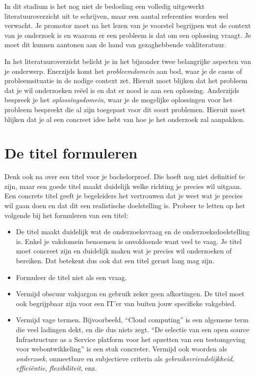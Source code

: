 In dit stadium is het nog niet de bedoeling een volledig uitgewerkt literatuuroverzicht uit te schrijven, maar een aantal referenties worden wel verwacht. Je promotor moet na het lezen van je voorstel begrijpen wat de context van je onderzoek is en waarom er een probleem is dat om een oplossing vraagt. Je moet dit kunnen aantonen aan de hand van gezaghebbende vakliteratuur.

In het literatuuroverzicht belicht je in het bijzonder twee belangrijke aspecten van je onderwerp. Enerzijds komt het \emph{probleemdomein} aan bod, waar je de casus of probleemsituatie in de nodige context zet. Hieruit moet blijken dat het probleem dat je wil onderzoeken reëel is en dat er nood is aan een oplossing. Anderzijds bespreek je het \emph{oplossingsdomein}, waar je de mogelijke oplossingen voor het probleem bespreekt die al zijn toegepast voor dit soort problemen. Hieruit moet blijken dat je al een concreet idee hebt van hoe je het onderzoek zal aanpakken.

\section{De titel formuleren}%
\label{sec:onderwerp_titel}

Denk ook na over een titel voor je bachelorproef. Die hoeft nog niet definitief te zijn, maar een goede titel maakt duidelijk welke richting je precies wil uitgaan. Een concrete titel geeft je begeleiders het vertrouwen dat je weet wat je precies wil gaan doen en dat dit een realistische doelstelling is. Probeer te letten op het volgende bij het formuleren van een titel:

\begin{itemize}
  \item De titel maakt duidelijk wat de onderzoeksvraag en de onderzoeksdoelstelling is. Enkel je vakdomein benoemen is onvoldoende want veel te vaag. Je titel moet concreet zijn en duidelijk maken wat je precies wil onderzoeken of bereiken. Dat betekent dus ook dat een titel gerust lang mag zijn.
  \item Formuleer de titel niet als een vraag.
  \item Vermijd obscuur vakjargon en gebruik zeker geen afkortingen. De titel moet ook begrijpbaar zijn voor een IT'er van buiten jouw specifieke vakgebied.
  \item Vermijd vage termen. Bijvoorbeeld, ``Cloud computing'' is een algemene term die veel ladingen dekt, en die dus niets zegt. ``De selectie van een open source Infrastructure as a Service platform voor het opzetten van een testomgeving voor webontwikkeling'' is een stuk concreter. Vermijd ook woorden als \emph{onderzoek}, onmeetbare en subjectieve criteria als \emph{gebruiksvriendelijkheid}, \emph{efficiëntie}, \emph{flexibiliteit}, enz.
\end{itemize}


